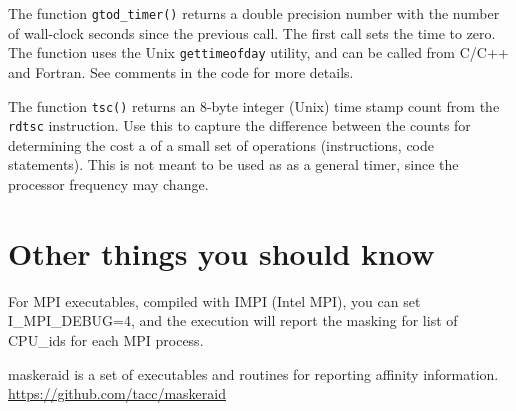 \documentclass[10pt,a4paper]{report}
\begin{document}
The function \verb+gtod_timer()+ returns a double precision number with the number
of wall-clock seconds since the previous call.  The first call sets the time
to zero. The function uses the Unix \verb+gettimeofday+ utility, and  can be called from 
C/C++ and Fortran.  See comments in the code for
more details.

The function \verb+tsc()+ returns an 8-byte integer (Unix) time stamp count from
the \verb+rdtsc+ instruction. Use this to capture the difference between the counts for
determining 
the cost a of a small set of operations (instructions, code statements). This is
not meant to be used as as a general timer, since the processor frequency may change.



\section{Other things you should know}
For MPI executables, compiled with IMPI (Intel MPI), 
you can set I\_MPI\_DEBUG=4, and the execution will
report the masking for list of CPU\_ids for each MPI process. 


\FloatBarrier
{}
\begin{thebibliography}{00}


 maskeraid is a set of executables and routines for reporting affinity information. \href{https://github.com/tacc/maskeraid}{https://github.com/tacc/maskeraid}


\end{thebibliography}
\end{document}
